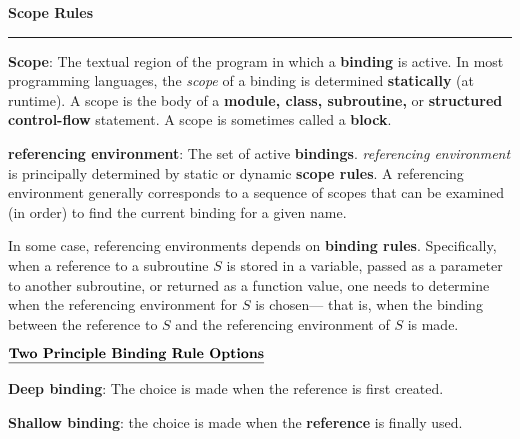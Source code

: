 \nopagenumbers
{\bf Scope Rules}
\vskip 1mm
\hrule

\vskip 6pt
{\bf Scope}: The textual region of the program in which a {\bf binding} is active. In most programming languages, the {\it scope} of a binding is determined {\bf statically} (at runtime). A scope is the body of a {\bf module, class, subroutine,} or {\bf structured control-flow} statement. A scope is sometimes called a {\bf block}.

\vskip 6pt
{\bf referencing environment}: The set of active {\bf bindings}. {\it referencing environment} is principally determined by static or dynamic {\bf scope rules}. A referencing environment generally corresponds to a sequence of scopes that can be examined (in order) to find the current binding for a given name.

\vskip 6pt
In some case, referencing environments depends on {\bf binding rules}. Specifically, when a reference to a subroutine $S$ is stored in a variable, passed as a parameter to another subroutine, or returned as a function value, one needs to determine when the referencing environment for $S$ is chosen--- that is, when the binding between the reference to $S$ and the referencing environment of $S$ is made.

\vskip 6pt
\centerline{$\underline{\hbox{{\bf Two Principle Binding Rule Options}}}$}

\vskip 6pt
{\bf Deep binding}: The choice is made when the reference is first created.

\vskip 6pt
{\bf Shallow binding}: the choice is made when the {\bf reference} is finally used.

\vfill\eject
